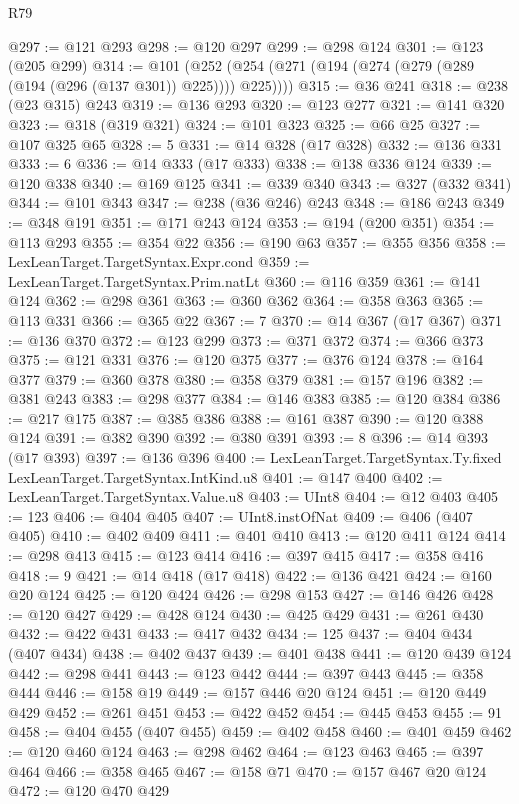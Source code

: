 \begin{lexlean}{R79}
\begin{coremodule}
@297 := @121 @293
@298 := @120 @297
@299 := @298 @124
@301 := @123 (@205 @299)
@314 := @101 (@252 (@254 (@271 (@194 (@274 (@279 (@289 (@194 (@296 (@137 @301)) @225)))) @225))))
@315 := @36 @241
@318 := @238 (@23 @315) @243
@319 := @136 @293
@320 := @123 @277
@321 := @141 @320
@323 := @318 (@319 @321)
@324 := @101 @323
@325 := @66 @25
@327 := @107 @325 @65
@328 := 5
@331 := @14 @328 (@17 @328)
@332 := @136 @331
@333 := 6
@336 := @14 @333 (@17 @333)
@338 := @138 @336 @124
@339 := @120 @338
@340 := @169 @125
@341 := @339 @340
@343 := @327 (@332 @341)
@344 := @101 @343
@347 := @238 (@36 @246) @243
@348 := @186 @243
@349 := @348 @191
@351 := @171 @243 @124
@353 := @194 (@200 @351)
@354 := @113 @293
@355 := @354 @22
@356 := @190 @63
@357 := @355 @356
@358 := LexLeanTarget.TargetSyntax.Expr.cond
@359 := LexLeanTarget.TargetSyntax.Prim.natLt
@360 := @116 @359
@361 := @141 @124
@362 := @298 @361
@363 := @360 @362
@364 := @358 @363
@365 := @113 @331
@366 := @365 @22
@367 := 7
@370 := @14 @367 (@17 @367)
@371 := @136 @370
@372 := @123 @299
@373 := @371 @372
@374 := @366 @373
@375 := @121 @331
@376 := @120 @375
@377 := @376 @124
@378 := @164 @377
@379 := @360 @378
@380 := @358 @379
@381 := @157 @196
@382 := @381 @243
@383 := @298 @377
@384 := @146 @383
@385 := @120 @384
@386 := @217 @175
@387 := @385 @386
@388 := @161 @387
@390 := @120 @388 @124
@391 := @382 @390
@392 := @380 @391
@393 := 8
@396 := @14 @393 (@17 @393)
@397 := @136 @396
@400 := LexLeanTarget.TargetSyntax.Ty.fixed LexLeanTarget.TargetSyntax.IntKind.u8
@401 := @147 @400
@402 := LexLeanTarget.TargetSyntax.Value.u8
@403 := UInt8
@404 := @12 @403
@405 := 123
@406 := @404 @405
@407 := UInt8.instOfNat
@409 := @406 (@407 @405)
@410 := @402 @409
@411 := @401 @410
@413 := @120 @411 @124
@414 := @298 @413
@415 := @123 @414
@416 := @397 @415
@417 := @358 @416
@418 := 9
@421 := @14 @418 (@17 @418)
@422 := @136 @421
@424 := @160 @20 @124
@425 := @120 @424
@426 := @298 @153
@427 := @146 @426
@428 := @120 @427
@429 := @428 @124
@430 := @425 @429
@431 := @261 @430
@432 := @422 @431
@433 := @417 @432
@434 := 125
@437 := @404 @434 (@407 @434)
@438 := @402 @437
@439 := @401 @438
@441 := @120 @439 @124
@442 := @298 @441
@443 := @123 @442
@444 := @397 @443
@445 := @358 @444
@446 := @158 @19
@449 := @157 @446 @20 @124
@451 := @120 @449 @429
@452 := @261 @451
@453 := @422 @452
@454 := @445 @453
@455 := 91
@458 := @404 @455 (@407 @455)
@459 := @402 @458
@460 := @401 @459
@462 := @120 @460 @124
@463 := @298 @462
@464 := @123 @463
@465 := @397 @464
@466 := @358 @465
@467 := @158 @71
@470 := @157 @467 @20 @124
@472 := @120 @470 @429

\end{coremodule}
\end{lexlean}
